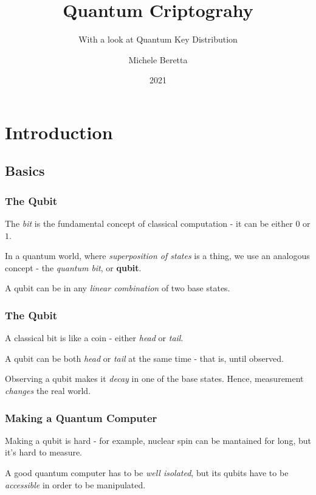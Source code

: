 \documentclass{beamer}
\title{Quantum Criptograhy}
\subtitle{With a look at Quantum Key Distribution}
\author{Michele Beretta}
\institute{UniBG
  \\ \url{https://github.com/micheleberetta98/qkd-presentation}
}
\date{2021}
\begin{document}
  \frame{\titlepage}


  \section{Introduction}
  \subsection{Basics}
  \begin{frame}
    \frametitle{The Qubit}
    The \textit{bit} is the fundamental concept of classical computation - it can be either $0$ or $1$.

    In a quantum world, where \textit{superposition of states} is a thing, we use an analogous concept -
    the \textit{quantum bit}, or \textbf{qubit}.

    A qubit can be in any \textit{linear combination} of two base states.
  \end{frame}
  \begin{frame}
    \frametitle{The Qubit}
    A classical bit is like a coin - either \textit{head} or \textit{tail}.

    A qubit can be both \textit{head} or \textit{tail} at the same time - that is, until observed.

    Observing a qubit makes it \textit{decay} in one of the base states. Hence, measurement
    \textit{changes} the real world.
  \end{frame}
  \begin{frame}
    \frametitle{Making a Quantum Computer}
    Making a qubit is hard - for example, nuclear spin can be mantained for long, but it's hard to measure.

    A good quantum computer has to be \textit{well isolated}, but its qubits have to be \textit{accessible}
    in order to be manipulated.
  \end{frame}
  
\end{document}
